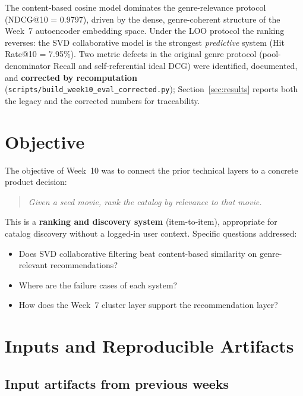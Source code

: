 \documentclass[12pt,a4paper]{article}
\begin{document}
The content-based cosine model dominates the genre-relevance protocol (NDCG@10 = 0.9797),
driven by the dense, genre-coherent structure of the Week~7 autoencoder embedding space.
Under the LOO protocol the ranking reverses: the SVD collaborative model is the strongest
\emph{predictive} system (Hit Rate@10 = 7.95\%). Two metric defects in the original genre
protocol (pool-denominator Recall and self-referential ideal DCG) were identified, documented,
and \textbf{corrected by recomputation} (\texttt{scripts/build\_week10\_eval\_corrected.py});
Section~\ref{sec:results} reports both the legacy and the corrected numbers for traceability.

\section{Objective}

The objective of Week~10 was to connect the prior technical layers to a concrete product decision:
\begin{quote}
  \textit{Given a seed movie, rank the catalog by relevance to that movie.}
\end{quote}

This is a \textbf{ranking and discovery system} (item-to-item), appropriate for catalog
discovery without a logged-in user context. Specific questions addressed:
\begin{itemize}[nosep]
  \item Does SVD collaborative filtering beat content-based similarity on genre-relevant recommendations?
  \item Where are the failure cases of each system?
  \item How does the Week~7 cluster layer support the recommendation layer?
\end{itemize}

\section{Inputs and Reproducible Artifacts}

\subsection{Input artifacts from previous weeks}
\end{document}
